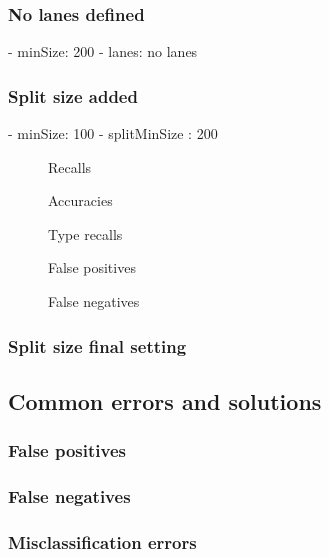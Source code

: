 \subsubsection{No lanes defined}
- minSize: 200
- lanes: no lanes

\subsubsection{Split size added}
- minSize: 100
- splitMinSize : 200

\begin{figure}[p]
	\centering
	\caption{Recalls}
\end{figure}

\begin{figure}[p]
	\centering
	\caption{Accuracies}
\end{figure}

\begin{figure}[p]
	\centering
	\caption{Type recalls}
\end{figure}

\begin{figure}[p]
	\centering
	\caption{False positives}
\end{figure}

\begin{figure}[p]
	\centering
	\caption{False negatives}
\end{figure}

\subsubsection{Split size final setting}

\subsection{Common errors and solutions}
\subsubsection{False positives}
\subsubsection{False negatives}
\subsubsection{Misclassification errors}

